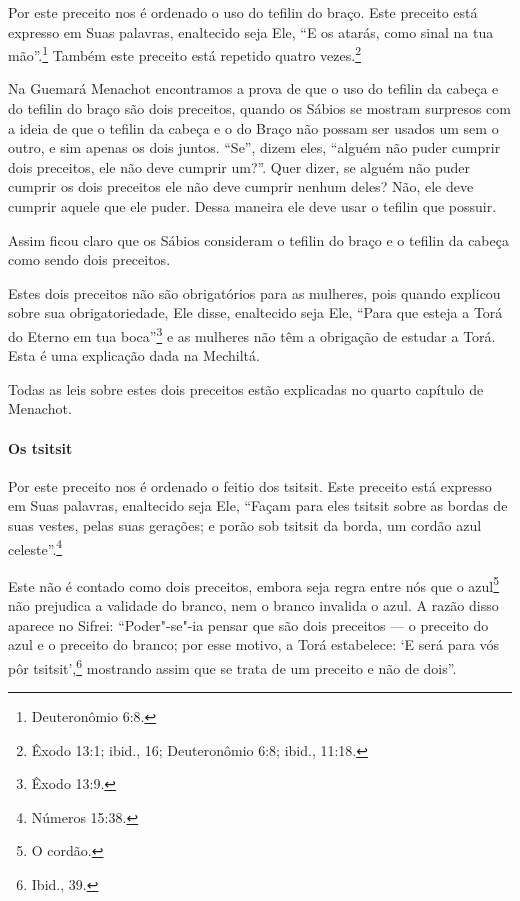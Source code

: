 \begin{multicols}{2}
Por este preceito nos é ordenado o uso do tefilin\starr{} do braço. Este
preceito está expresso em Suas palavras, enaltecido seja Ele, ``E os
atarás, como sinal na tua mão''.\footnote{Deuteronômio 6:8.} Também este preceito
está repetido quatro vezes.\footnote{Êxodo 13:1; ibid., 16; Deuteronômio 6:8;
ibid., 11:18.}

Na Guemará\starr{} Menachot\starr{} encontramos a prova de que o uso do tefilin\starr{} da cabeça e do tefilin\starr{} do braço são dois preceitos, quando os Sábios se
mostram surpresos com a ideia de que o tefilin\starr{} da cabeça e o do
Braço não possam ser usados um sem o outro, e sim apenas os dois juntos.
``Se'', dizem eles, ``alguém não puder cumprir dois preceitos, ele não
deve cumprir um?''. Quer dizer, se alguém não puder cumprir os dois
preceitos ele não deve cumprir nenhum deles? Não, ele deve cumprir
aquele que ele puder. Dessa maneira ele deve usar o tefilin\starr{} que
possuir.

Assim ficou claro que os Sábios consideram o tefilin\starr{} do braço e o
tefilin\starr{} da cabeça como sendo dois preceitos.

Estes dois preceitos não são obrigatórios para as mulheres, pois quando
explicou sobre sua obrigatoriedade, Ele disse, enaltecido seja Ele,
``Para que esteja a Torá\starr{} do Eterno em tua boca''\footnote{Êxodo 13:9.} e as
mulheres não têm a obrigação de estudar a Torá\starr. Esta é uma explicação
dada na Mechiltá\starr.

Todas as leis sobre estes dois preceitos estão explicadas no quarto
capítulo de Menachot\starr.

\paragraph{Os tsitsit\starr}

Por este preceito nos é ordenado o feitio dos tsitsit\starr. Este
preceito está expresso em Suas palavras, enaltecido seja Ele, ``Façam
para eles tsitsit\starr{} sobre as bordas de suas vestes, pelas suas gerações;
e porão sob tsitsit\starr{} da borda, um cordão azul celeste''.\footnote{Números
15:38.}

Este não é contado como dois preceitos, embora seja regra entre nós que
o azul\footnote{O cordão.} não prejudica a validade do
branco, nem o branco invalida
o azul. A razão disso aparece no Sifrei\starr:
``Poder"-se"-ia pensar que são dois preceitos --- o preceito do azul e o
preceito do branco; por esse motivo, a Torá\starr{} estabelece: `E será para
vós pôr tsitsit\starr',\footnote{Ibid., 39.} mostrando assim que se trata de um
preceito e não de dois''.


\end{multicols}
